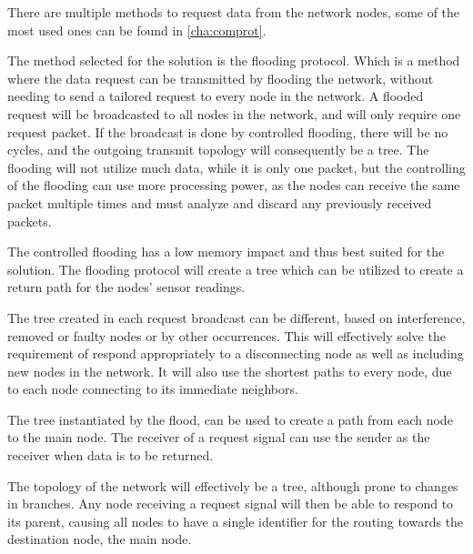 There are multiple methods to request data from the network nodes, some of the most used ones can be found in \ref{cha:comprot}. 

The method selected for the solution is the flooding protocol.
Which is a method where the data request can be transmitted by flooding the network, without needing to send a tailored request to every node in the network. 
A flooded request will be broadcasted to all nodes in the network, and will only require one request packet. 
If the broadcast is done by controlled flooding, there will be no cycles, and the outgoing transmit topology will consequently be a tree. 
The flooding will not utilize much data, while it is only one packet, but the controlling of the flooding can use more processing power, as the nodes can receive the same packet multiple times and must analyze and discard any previously received packets.

The controlled flooding has a low memory impact and thus best suited for the solution. The flooding protocol will create a tree which can be utilized to create a return path for the nodes' sensor readings.

The tree created in each request broadcast can be different, based on interference, removed or faulty nodes or by other occurrences. 
This will effectively solve the requirement of respond appropriately to a disconnecting node as well as including new nodes in the network. 
It will also use the shortest paths to every node, due to each node connecting to its immediate neighbors. 

The tree instantiated by the flood, can be used to create a path from each node to the main node.
The receiver of a request signal can use the sender as the receiver when data is to be returned.

The topology of the network will effectively be a tree, although prone to changes in branches. Any node receiving a request signal will then be able to respond to its parent, causing all nodes to have a single identifier for the routing towards the destination node, the main node.

